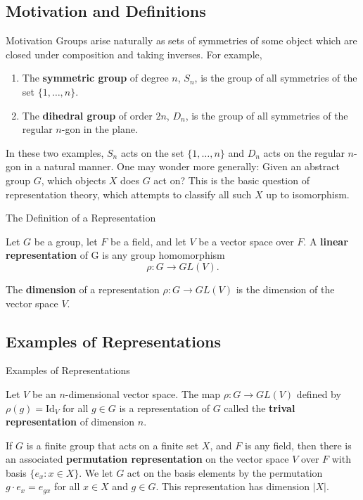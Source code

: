 \subsection{Motivation and Definitions}
\begin{frame}{Motivation}
Groups arise naturally as sets of symmetries of some object which are closed under composition and taking inverses.  For example, 
\begin{enumerate}
\item The \textbf{symmetric group} of degree $n$, $S_n$, is the group of all symmetries of the set $\{ 1, \ldots, n \}$.
\item The \textbf{dihedral group} of order $2n$, $D_{n}$, is the group of all symmetries of the regular $n$-gon in the plane.
\end{enumerate}
In these two examples, $S_n$  acts on the set $\{ 1, \ldots, n \}$ and $D_{n}$ acts on the regular $n$-gon in a natural manner. One may wonder more generally:  Given an abstract group $G$, which objects $X$ does $G$ act on?
This is the basic question of representation theory, which attempts to classify all such $X$ up to isomorphism.
\end{frame}


\begin{frame}{The Definition of a Representation}
\begin{definition}
Let $G$ be a group, let $F$ be a field, and let $V$ be a vector space over $F$.  A \textbf{linear representation} of G is any group homomorphism \[\rho\colon G \to GL(V).\]
\end{definition}

\begin{definition}
The \textbf{dimension} of a representation $\rho \colon G \to GL(V)$ is the dimension of the vector space $V$.  
\end{definition}
\end{frame}


\subsection{Examples of Representations}
\begin{frame}{Examples of Representations}
\begin{example}
Let $V$ be an $n$-dimensional vector space.  The map $\rho \colon G \to GL(V)$ defined by $\rho(g) = \text{Id}_V$ for all $g \in G$ is a representation of $G$ called the \textbf{trival representation} of dimension $n$. 
\end{example}

\begin{example} If $G$ is a finite group that acts on a finite set $X$, and $F$ is any field, then there is an associated \textbf{permutation representation}  on the vector space $V$ over $F$ with basis $\{e_x \colon x \in X\}$.  We let $G$ act on the basis elements by the permutation $g \cdot e_x = e_{gx}$ for all $x \in X$ and $g \in G$. This representation has dimension $|X|$.  \end{example}
\end{frame}

